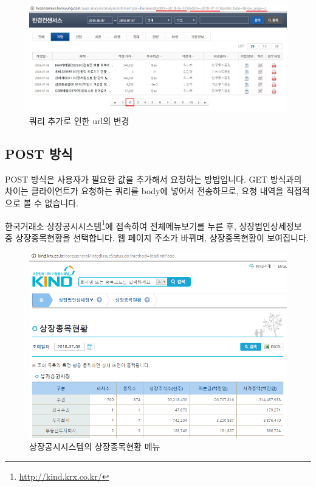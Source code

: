 \documentclass[12pt,]{book}
\let\rmarkdownfootnote\footnote%
\def\footnote{\protect\rmarkdownfootnote}
\begin{document}
\begin{figure}[h]

{\centering \includegraphics[width=1\linewidth]{images/crawl_hk2} 

}

\caption{쿼리 추가로 인한 url의 변경}\label{fig:unnamed-chunk-4}
\end{figure}

\hypertarget{post-}{%
\subsection{POST 방식}\label{post-}}

POST 방식은 사용자가 필요한 값을 추가해서 요청하는 방법입니다. GET 방식과의 차이는 클라이언트가 요청하는 쿼리를 body에 넣어서 전송하므로, 요청 내역을 직접적으로 볼 수 없습니다.

한국거래소 상장공시시스템\footnote{\url{http://kind.krx.co.kr/}}에 접속하여 전체메뉴보기를 누른 후, 상장법인상세정보 중 상장종목현황을 선택합니다. 웹 페이지 주소가 바뀌며, 상장종목현황이 보여집니다.

\begin{figure}[h]

{\centering \includegraphics[width=0.7\linewidth]{images/crawl_corp_list} 

}

\caption{상장공시시스템의 상장종목현황 메뉴}\label{fig:unnamed-chunk-5}
\end{figure}
\end{document}
